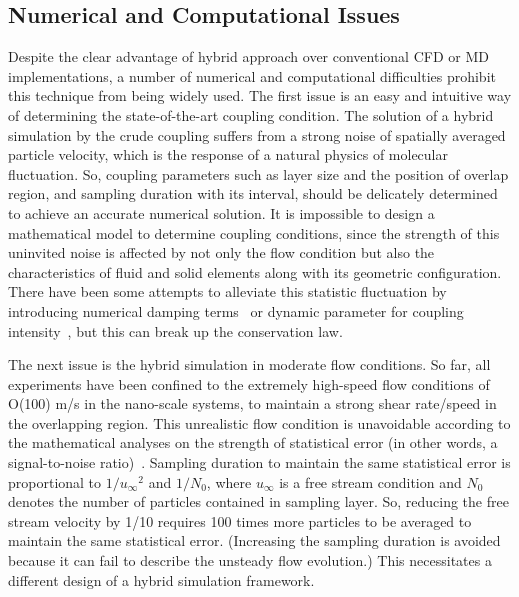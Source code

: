 \documentclass[preprint,12pt]{elsarticle}
\begin{document}
\subsection{Numerical and Computational Issues}
Despite the clear advantage of hybrid approach over conventional CFD or MD implementations,
a number of numerical and computational difficulties prohibit this technique from being widely used.
The first issue is an easy and intuitive way of determining the state-of-the-art coupling condition. The solution of a hybrid simulation by the crude coupling suffers from a strong noise of spatially averaged particle velocity, which is the response of a natural physics of molecular fluctuation. So, coupling parameters such as layer size and the position of overlap region, and sampling duration with its interval, should be delicately determined to achieve an accurate numerical solution. It is impossible to design a mathematical model to determine coupling conditions, since the strength of this uninvited noise is affected by not only the flow condition but also the characteristics of fluid and solid elements along with its geometric configuration. There have been some attempts to alleviate this statistic fluctuation by introducing numerical damping terms~\cite{Thompson,Cui} or dynamic parameter for coupling intensity~\cite{Wang}, but this can break up the conservation law.

The next issue is the hybrid simulation in moderate flow conditions. So far, all experiments have been confined to the extremely high-speed flow conditions of O(100) m/s in the nano-scale systems, to maintain a strong shear rate/speed in the overlapping region.
This unrealistic flow condition is unavoidable according to the mathematical analyses on the strength of statistical error (in other words, a signal-to-noise ratio)~\cite{Hadjicon3,Time_Mechanism}. Sampling duration to maintain the same statistical error is proportional to ${{1} / {{u}_{\infty}}^2}$ and ${{1} / {N_0}}$, where ${u_{\infty}}$ is a free stream condition and ${N_0}$ denotes the number of particles contained in sampling layer.
So, reducing the free stream velocity by 1/10 requires 100 times more particles to be averaged to maintain the same statistical error. (Increasing the sampling duration is avoided because it can fail to describe the unsteady flow evolution.) This necessitates a different design of a hybrid simulation framework.
\end{document}
